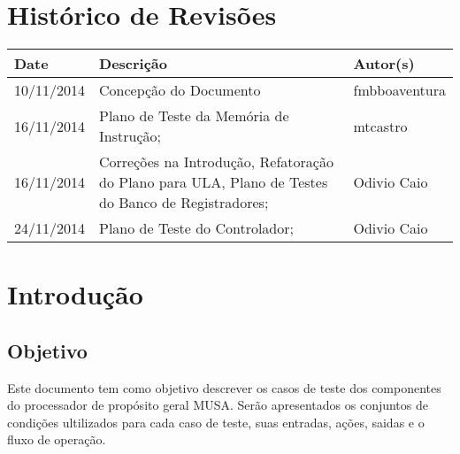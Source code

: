 \documentclass{article}
\begin{document}

\capa
\newpage

\section*{\center Histórico de Revisões}
  \vspace*{1cm}
  \begin{table}[ht]
    \centering
    \begin{tabular}[pos]{|m{2cm} | m{7.2cm} | m{3.8cm}|} 
      \hline
      \cellcolor[gray]{0.9}
      \textbf{Date} & \cellcolor[gray]{0.9}\textbf{Descrição} & \cellcolor[gray]{0.9}\textbf{Autor(s)}\\ \hline
      \hline
      \small 10/11/2014 & \small Concepção do Documento & \small fmbboaventura \\ \hline      
       \small 16/11/2014 & \small  Plano de Teste da Memória de Instrução; & \small mtcastro \\ \hline     
         \small 16/11/2014 & \small  Correções na Introdução, Refatoração do Plano para ULA, Plano de Testes do Banco de Registradores; & \small Odivio Caio \\ \hline
	\small 24/11/2014 & \small  Plano de Teste do Controlador; & \small Odivio Caio \\ \hline        
   
    \end{tabular}
  \end{table}

\newpage

\tableofcontents
\newpage

\section{Introdução}

  \subsection{Objetivo}
  Este documento tem como objetivo descrever os casos de teste dos componentes do processador de propósito geral MUSA. Serão apresentados os conjuntos de condições ultilizados para cada caso de teste, suas entradas, ações, saidas e o fluxo de operação.
  
\end{document}
